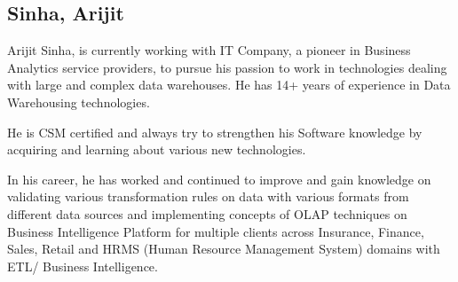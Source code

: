 \subsection{Sinha, Arijit}
Arijit Sinha, is currently working with IT Company, a pioneer in Business Analytics service providers, to pursue his passion to work in technologies dealing with large and complex data warehouses. He has 14+ years of experience in Data Warehousing technologies.

He is CSM certified and always try to strengthen his Software knowledge by acquiring and learning about various new technologies.

In his career, he has worked and continued to improve and gain knowledge on validating various transformation rules on data with various formats from different data sources and implementing concepts of OLAP techniques on Business Intelligence Platform for multiple clients across Insurance, Finance, Sales, Retail and HRMS (Human Resource Management System) domains with ETL/ Business Intelligence.
